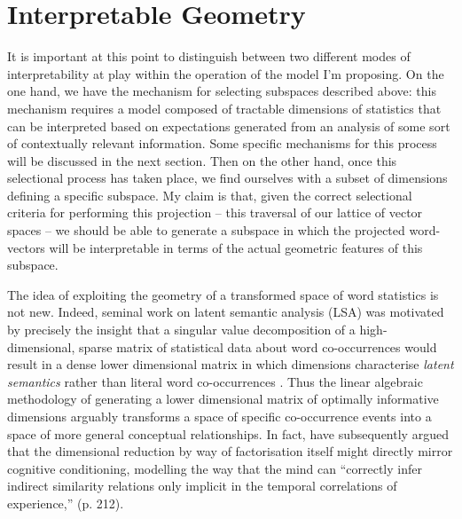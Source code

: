 {\section{Interpretable Geometry}
It is important at this point to distinguish between two different modes of interpretability at play within the operation of the model I'm proposing.  On the one hand, we have the mechanism for selecting subspaces described above: this mechanism requires a model composed of tractable dimensions of statistics that can be interpreted based on expectations generated from an analysis of some sort of contextually relevant information.  Some specific mechanisms for this process will be discussed in the next section.  Then on the other hand, once this selectional process has taken place, we find ourselves with a subset of dimensions defining a specific subspace.  My claim is that, given the correct selectional criteria for performing this projection -- this traversal of our lattice of vector spaces -- we should be able to generate a subspace in which the projected word-vectors will be interpretable in terms of the actual geometric features of this subspace.

The idea of exploiting the geometry of a transformed space of word statistics is not new.  Indeed, seminal work on latent semantic analysis (LSA) was motivated by precisely the insight that a singular value decomposition of a high-dimensional, sparse matrix of statistical data about word co-occurrences would result in a dense lower dimensional matrix in which dimensions characterise \emph{latent semantics} rather than literal word co-occurrences \citep{DeerwesterEA1990}.  Thus the linear algebraic methodology of generating a lower dimensional matrix of optimally informative dimensions arguably transforms a space of specific co-occurrence events into a space of more general conceptual relationships.  In fact, \cite{LandauerEA1997} have subsequently argued that the dimensional reduction by way of factorisation itself might directly mirror cognitive conditioning, modelling the way that the mind can ``correctly infer indirect similarity relations only implicit in the temporal correlations of experience,'' (p. 212).

}
